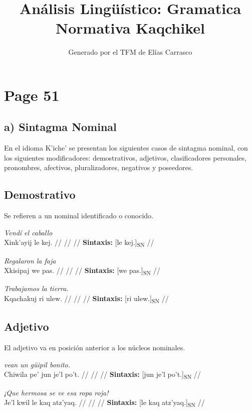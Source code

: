 \documentclass{article}%
\title{Análisis Lingüístico: Gramatica Normativa Kaqchikel}%
\author{Generado por el TFM de Elías Carrasco}%
\begin{document}
%
\normalsize%
\maketitle%
\section{Page 51}%
\label{sec:Page51}%
\subsection{a) Sintagma Nominal}%
\label{subsec:a)SintagmaNominal}%

%
En el idioma K'iche' se presentan los siguientes casos de sintagma nominal, con los %
siguientes modificadores: demostrativos, adjetivos, clasificadores personales, pronombres, %
afectivos, pluralizadores, negativos y poseedores. %
\subsection{Demostrativo}%
\label{subsec:Demostrativo}%

%
Se refieren a un nominal identificado o conocido. %
\par\medskip%
\ex
\textit{Vendí el caballo} \\
\begingl
\gla Xink'ayij le kej. //
\glb  //
\glc  //
\glft \textbf{Sintaxis:} [le kej.]\textsubscript{SN} //
\endgl
\xe
%
\medskip%
\par\medskip%
\ex
\textit{Regalaron la faja} \\
\begingl
\gla Xkisipaj we pas. //
\glb  //
\glc  //
\glft \textbf{Sintaxis:} [we pas.]\textsubscript{SN} //
\endgl
\xe
%
\medskip%
\par\medskip%
\ex
\textit{Trabajamos la tierra.} \\
\begingl
\gla Kqachakuj ri ulew. //
\glb  //
\glc  //
\glft \textbf{Sintaxis:} [ri ulew.]\textsubscript{SN} //
\endgl
\xe
%
\medskip%
\subsection{Adjetivo}%
\label{subsec:Adjetivo}%

%
El adjetivo va en posición anterior a los núcleos nominales. %
\par\medskip%
\ex
\textit{vean un güipil bonito.} \\
\begingl
\gla Chiwila pe' jun je'l po't. //
\glb  //
\glc  //
\glft \textbf{Sintaxis:} [jun je'l po't.]\textsubscript{SN} //
\endgl
\xe
%
\medskip%
\par\medskip%
\ex
\textit{¡Que hermosa se ve esa ropa roja!} \\
\begingl
\gla Je'l kwil le kaq atz'yaq. //
\glb  //
\glc  //
\glft \textbf{Sintaxis:} [le kaq atz'yaq.]\textsubscript{SN} //
\endgl
\xe
%
\medskip%
\end{document}
